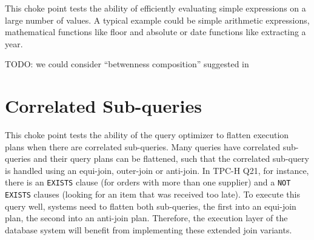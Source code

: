 

This choke point tests the ability of efficiently evaluating simple expressions on a large number of values. A typical example could be simple arithmetic expressions, mathematical functions like floor and absolute or date functions like extracting a year.



%
%
%

 
TODO: we could consider ``betwenness composition'' suggested in~\cite{DBLP:journals/pvldb/DreselerBRU20}




\section{Correlated Sub-queries}



This choke point tests the ability of the query optimizer to flatten execution plans when there are correlated sub-queries. Many queries have correlated sub-queries and their query plans can be flattened,
such that the correlated sub-query is handled using an equi-join, outer-join or anti-join.
In TPC-H Q21, for instance, there is an \lstinline{EXISTS} clause (for orders with more than one supplier) and a \lstinline{NOT EXISTS} clauses (looking for an item that was received too late).
To execute this query well, systems need to flatten both sub-queries, the first into an equi-join plan, the second into an anti-join plan.
Therefore, the execution layer of the database system will benefit from implementing these extended join variants.

